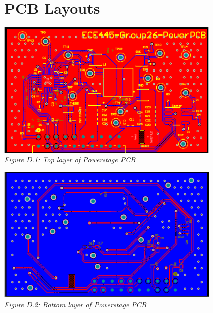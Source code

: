 \section{PCB Layouts} \label{appendix:d}

\begin{center}
    \includegraphics[width=0.8\textwidth]{images/powerstage_pcb_top.png}\\
    \it Figure D.1: Top layer of Powerstage PCB\\
    \vspace{\baselineskip}

    \includegraphics[width=0.8\textwidth]{images/powerstage_pcb_bottom.png}\\
    \it Figure D.2: Bottom layer of Powerstage PCB\\
    \vspace{\baselineskip}


\end{center}
